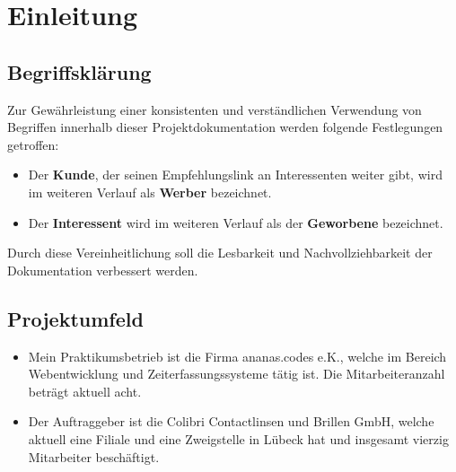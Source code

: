 \section{Einleitung}
\label{sec:Einleitung}

\subsection{Begriffsklärung}
\label{sec:Begriffsklaerung}
Zur Gewährleistung einer konsistenten und verständlichen Verwendung von Begriffen innerhalb dieser Projektdokumentation werden folgende Festlegungen getroffen:
\begin{itemize}
    \item Der \textbf{Kunde}, der seinen Empfehlungslink an Interessenten weiter gibt, wird im weiteren Verlauf als \textbf{Werber} bezeichnet.
    \item Der \textbf{Interessent} wird im weiteren Verlauf als der \textbf{Geworbene} bezeichnet.
\end{itemize}
Durch diese Vereinheitlichung soll die Lesbarkeit und Nachvollziehbarkeit der Dokumentation verbessert werden.

\subsection{Projektumfeld}
\label{sec:Projektumfeld}
\begin{itemize}
    \item Mein Praktikumsbetrieb ist die Firma ananas.codes e.K., welche im Bereich Webentwicklung und Zeiterfassungssysteme tätig ist. Die Mitarbeiteranzahl beträgt aktuell acht.
    \item Der Auftraggeber ist die Colibri Contactlinsen und Brillen GmbH, welche aktuell eine Filiale und eine Zweigstelle in Lübeck hat und insgesamt vierzig Mitarbeiter beschäftigt.
\end{itemize}


